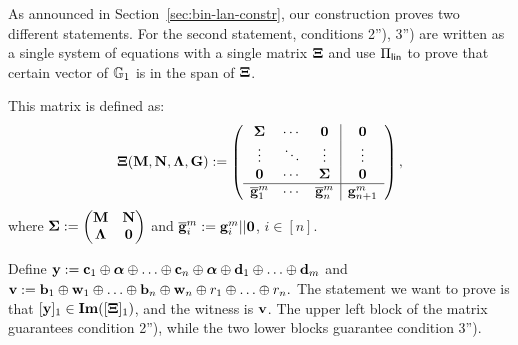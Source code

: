As announced in Section~\ref{sec:bin-lan-constr}, our construction proves two different statements. For the second statement, conditions 2''), 3'') are written as a single system of equations with a single matrix $\mathbf{{\Xi}}$ and use $\Pi_{\mathsf{lin}}$ to prove that certain vector of $\mathbb{G}_1$ is in the span of $\mathbf{{\Xi}}$.

This matrix is defined as:
$$\mathbf{{\Xi}}(\mathbf{{M}},\mathbf{{N}},\mathbf{{\Lambda}},\mathbf{{G}}):=
\left(\begin{array}{ccc|ccc}
\mathbf{{\Sigma}}             & \cdots & \mathbf{{0}}                  & \mathbf{{0}} \\
\vdots                    & \ddots & \vdots                    & \vdots   \\
\mathbf{{0}}                  & \cdots & \mathbf{{\Sigma}}             & \mathbf{{0}} \\
\hline
\overline{\mathbf{g}}_1^{m} & \cdots & \overline{\mathbf{g}}_n^{m} & \mathbf{g}_{n+1}^{m}
\end{array}\right),
$$ where $\mathbf{{\Sigma}}:=\begin{pmatrix}
    \mathbf{{M}}       & \mathbf{{N}}\\
    \mathbf{{\Lambda}} & \mathbf{{0}}
\end{pmatrix}$ and
 $\overline{\mathbf{g}}_i^{m}:=\mathbf{g}_i^{m}||\mathbf{0}$, $i\in[n]$. 
 
Define $\mathbf{y}:=\mathbf{c}_1\oplus {\boldsymbol \alpha}
\oplus \ldots \oplus \mathbf{c}_n\oplus {\boldsymbol \alpha} 
\oplus \mathbf{d}_1 \oplus  \ldots \oplus  \mathbf{d}_m$
and 
 $\mathbf{v}:=\mathbf{b}_1\oplus \mathbf{w}_1 \oplus \ldots \oplus \mathbf{b}_n\oplus \mathbf{w}_n \oplus r_1 \oplus \ldots \oplus r_n.$ The statement we want to prove is that $[\mathbf{y}]_1 \in \mathbf{Im}([\mathbf{{\Xi}}]_1)$, and the witness is $\mathbf{v}$. The upper left block of the matrix guarantees condition 2''), while the two lower blocks guarantee 
condition 3'').

\iffull
\else

\fi
